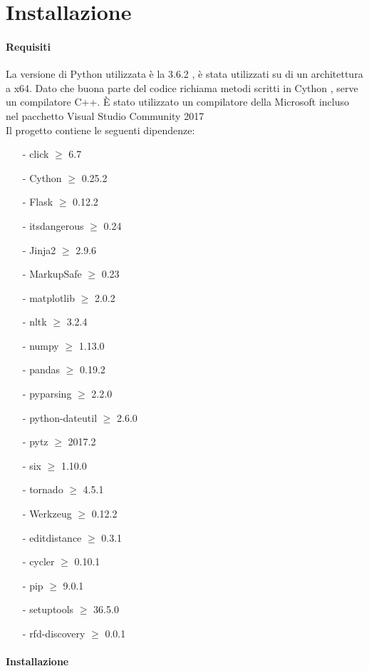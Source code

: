 \section{Installazione}
\paragraph{Requisiti}
La versione di Python utilizzata è la 3.6.2 , è stata utilizzati su di un architettura a x64.
Dato che buona parte del codice richiama metodi scritti in Cython , serve un compilatore C++. È stato utilizzato un compilatore della Microsoft incluso nel pacchetto Visual Studio Community 2017 \\
Il progetto contiene le seguenti dipendenze:
\begin{itemize}[noitemsep]
\item[-] click $\geq$ 6.7
\item[-] Cython $\geq$ 0.25.2
\item[-] Flask $\geq$ 0.12.2
\item[-] itsdangerous $\geq$ 0.24
\item[-] Jinja2 $\geq$ 2.9.6
\item[-] MarkupSafe $\geq$ 0.23
\item[-] matplotlib $\geq$ 2.0.2
\item[-] nltk $\geq$ 3.2.4
\item[-] numpy $\geq$ 1.13.0
\item[-] pandas $\geq$ 0.19.2
\item[-] pyparsing $\geq$ 2.2.0
\item[-] python-dateutil $\geq$ 2.6.0
\item[-] pytz $\geq$ 2017.2
\item[-] six $\geq$ 1.10.0
\item[-] tornado $\geq$ 4.5.1
\item[-] Werkzeug $\geq$ 0.12.2
\item[-] editdistance $\geq$ 0.3.1
\item[-] cycler $\geq$ 0.10.1
\item[-] pip $\geq$ 9.0.1
\item[-] setuptools $\geq$ 36.5.0
\item[-] rfd-discovery $\geq$ 0.0.1
\end{itemize}
\paragraph{Installazione}

